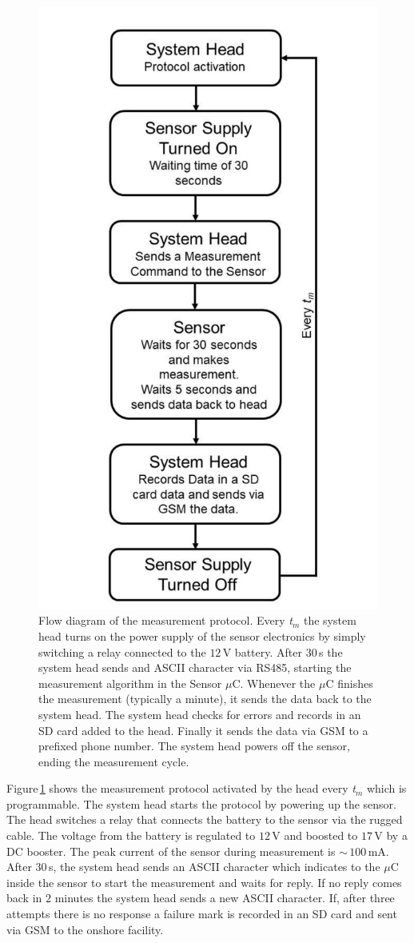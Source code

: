 \documentclass[journal,twoside,web]{ieeecolor}
\begin{document}
\begin{figure}[!t]
\centering
\includegraphics [trim = 35mm 0mm 20mm 10mm, clip, width=0.7\columnwidth]{images/fig2_2.pdf}
\caption{Flow diagram of the measurement protocol. Every \textit{t$_{m}$} the system head turns on the power supply of the sensor electronics by simply switching a relay connected to the $12$\,V battery. After $30$\,s the system head sends and ASCII character via RS485, starting the measurement algorithm in the Sensor $\mu$C. Whenever the $\mu$C finishes the measurement (typically a minute), it sends the data back to the system head. The system head checks for errors and records in an SD card added to the head. Finally it sends the data via GSM to a prefixed phone number. The system head powers off the sensor, ending the measurement cycle.}
\label{fig:typCorrSensor}
\vspace{-0.5cm}
\end{figure}
Figure\,\ref{fig:typCorrSensor} shows the measurement protocol activated by the head every \textit{t$_{m}$} which is programmable. The system head starts the protocol by powering up the sensor. The head switches a relay that connects the battery to the sensor via the rugged cable. The voltage from the battery is regulated to $12$\,V and boosted to $17$\,V by a DC booster. The peak current of the sensor during measurement is $\sim$\,$100$\,mA. After $30$\,s, the system head sends an ASCII character which indicates to the $\mu$C inside the sensor to start the measurement and waits for reply. If no reply comes back in $2$ minutes the system head sends a new ASCII character. If, after three attempts there is no response a failure mark is recorded in an SD card and sent via GSM to the onshore facility.
\end{document}
